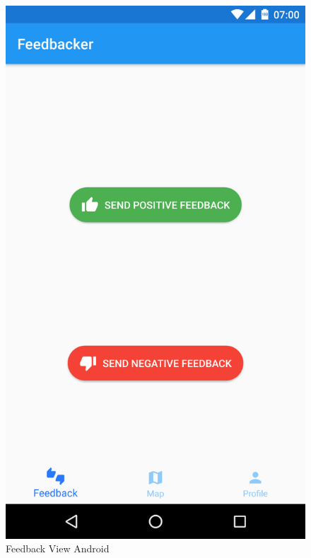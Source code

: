 \begin{figure}[H]
  \includegraphics[width=\linewidth]{bilder/Screenshot_Send_Feedback.png}
  \caption{Feedback View Android}\label{fig_send}
\endminipage\hfill
{}

\end{figure}
